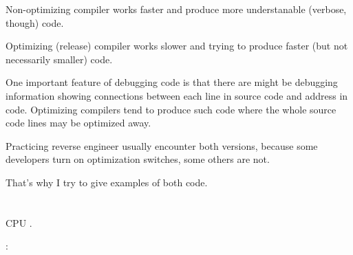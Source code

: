 Non-optimizing compiler works faster and produce more understanable (verbose, though) code.

Optimizing (release) compiler works slower and trying to produce faster (but not necessarily smaller) code.

One important feature of debugging code is that there are might be debugging information showing connections
between each line in source code and address in code.
Optimizing compilers tend to produce such code where the whole source code lines may be optimized away.

Practicing reverse engineer usually encounter both versions, because some developers turn on optimization
switches, some others are not.

That's why I try to give examples of both code.

\fi

\chapter{}

 \ac{CPU} .

:

